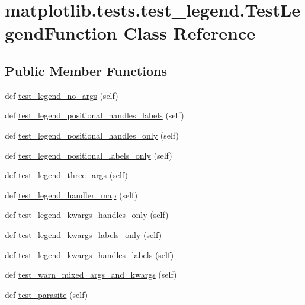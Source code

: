 \hypertarget{classmatplotlib_1_1tests_1_1test__legend_1_1TestLegendFunction}{}\section{matplotlib.\+tests.\+test\+\_\+legend.\+Test\+Legend\+Function Class Reference}
\label{classmatplotlib_1_1tests_1_1test__legend_1_1TestLegendFunction}
\subsection*{Public Member Functions}
\begin{DoxyCompactItemize}
\item 
def \hyperlink{classmatplotlib_1_1tests_1_1test__legend_1_1TestLegendFunction_a11be469336fa77877cb8d943b70b0fb1}{test\+\_\+legend\+\_\+no\+\_\+args} (self)
\item 
def \hyperlink{classmatplotlib_1_1tests_1_1test__legend_1_1TestLegendFunction_a047ffb6d8e9487a295b68b81aa1cc1df}{test\+\_\+legend\+\_\+positional\+\_\+handles\+\_\+labels} (self)
\item 
def \hyperlink{classmatplotlib_1_1tests_1_1test__legend_1_1TestLegendFunction_a2696e171a7f73191ba5b4ea8023ee426}{test\+\_\+legend\+\_\+positional\+\_\+handles\+\_\+only} (self)
\item 
def \hyperlink{classmatplotlib_1_1tests_1_1test__legend_1_1TestLegendFunction_acc43dfb1c7d8e23f179e52924107a15b}{test\+\_\+legend\+\_\+positional\+\_\+labels\+\_\+only} (self)
\item 
def \hyperlink{classmatplotlib_1_1tests_1_1test__legend_1_1TestLegendFunction_a89721a5c5bccd6a1d8bc8bb15af04de7}{test\+\_\+legend\+\_\+three\+\_\+args} (self)
\item 
def \hyperlink{classmatplotlib_1_1tests_1_1test__legend_1_1TestLegendFunction_ada9343ff5488b31610f59a8c12485c1c}{test\+\_\+legend\+\_\+handler\+\_\+map} (self)
\item 
def \hyperlink{classmatplotlib_1_1tests_1_1test__legend_1_1TestLegendFunction_a2571a699a390c85f8ff5b8dae23af4e1}{test\+\_\+legend\+\_\+kwargs\+\_\+handles\+\_\+only} (self)
\item 
def \hyperlink{classmatplotlib_1_1tests_1_1test__legend_1_1TestLegendFunction_a05ff8a8379a60fd0700a484921057861}{test\+\_\+legend\+\_\+kwargs\+\_\+labels\+\_\+only} (self)
\item 
def \hyperlink{classmatplotlib_1_1tests_1_1test__legend_1_1TestLegendFunction_a6ed0f71456d78f533cceb95e1d5b1639}{test\+\_\+legend\+\_\+kwargs\+\_\+handles\+\_\+labels} (self)
\item 
def \hyperlink{classmatplotlib_1_1tests_1_1test__legend_1_1TestLegendFunction_a20f2377a4c3514ab3b2432c35e13b9be}{test\+\_\+warn\+\_\+mixed\+\_\+args\+\_\+and\+\_\+kwargs} (self)
\item 
def \hyperlink{classmatplotlib_1_1tests_1_1test__legend_1_1TestLegendFunction_a60befc5d2c37d4ab24e88d0fb01c1ae5}{test\+\_\+parasite} (self)
\end{DoxyCompactItemize}


